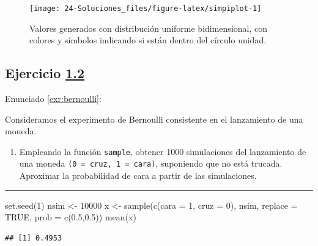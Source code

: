 \documentclass[
]{book}
\newenvironment{Shaded}{\begin{snugshade}}{\end{snugshade}}
\newcommand{\AttributeTok}[1]{\textcolor[rgb]{0.77,0.63,0.00}{#1}}
\newcommand{\ConstantTok}[1]{\textcolor[rgb]{0.00,0.00,0.00}{#1}}
\newcommand{\DecValTok}[1]{\textcolor[rgb]{0.00,0.00,0.81}{#1}}
\newcommand{\FloatTok}[1]{\textcolor[rgb]{0.00,0.00,0.81}{#1}}
\newcommand{\FunctionTok}[1]{\textcolor[rgb]{0.00,0.00,0.00}{#1}}
\newcommand{\NormalTok}[1]{#1}
\newcommand{\OtherTok}[1]{\textcolor[rgb]{0.56,0.35,0.01}{#1}}
\providecommand{\tightlist}{%
  \setlength{\itemsep}{0pt}\setlength{\parskip}{0pt}}
\theoremstyle{break}
\theoremstyle{nonumberplain}
\begin{document}
\begin{figure}[!htb]

{\centering \texttt{[image: 24-Soluciones\_files/figure-latex/simpiplot-1]} 

}

\caption{Valores generados con distribución uniforme bidimensional, con colores y símbolos indicando si están dentro del círculo unidad.}\label{fig:simpiplot}
\end{figure}

\hypertarget{sol-bernoulli}{%
\subsection{\texorpdfstring{Ejercicio \href{ejercicios.html\#exr:bernoulli}{1.2}}{Ejercicio 1.2}}\label{sol-bernoulli}}

Enunciado \ref{exr:bernoulli}:

Consideramos el experimento de Bernoulli consistente en el
lanzamiento de una moneda.

\begin{enumerate}
\def\labelenumi{\alph{enumi})}
\tightlist
\item
  Empleando la función \texttt{sample}, obtener 1000 simulaciones del
  lanzamiento de una moneda \texttt{(0\ =\ cruz,\ 1\ =\ cara)}, suponiendo que
  no está trucada. Aproximar la probabilidad de cara a partir de
  las simulaciones.
\end{enumerate}

\begin{center}\rule{0.5\linewidth}{0.5pt}\end{center}

\begin{Shaded}
\begin{Highlighting}[]
\FunctionTok{set.seed}\NormalTok{(}\DecValTok{1}\NormalTok{)}
\NormalTok{nsim }\OtherTok{\textless{}{-}} \DecValTok{10000}
\NormalTok{x }\OtherTok{\textless{}{-}} \FunctionTok{sample}\NormalTok{(}\FunctionTok{c}\NormalTok{(}\AttributeTok{cara =} \DecValTok{1}\NormalTok{, }\AttributeTok{cruz =} \DecValTok{0}\NormalTok{), nsim, }\AttributeTok{replace =} \ConstantTok{TRUE}\NormalTok{, }\AttributeTok{prob =} \FunctionTok{c}\NormalTok{(}\FloatTok{0.5}\NormalTok{,}\FloatTok{0.5}\NormalTok{))}
\FunctionTok{mean}\NormalTok{(x)}
\end{Highlighting}
\end{Shaded}

\begin{verbatim}
## [1] 0.4953
\end{verbatim}
\end{document}

